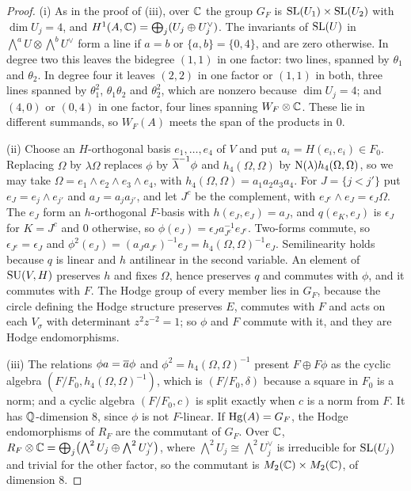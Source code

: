 \begin{proof}
(i) As in the proof of (iii), over $\mathbb{C}$ the group $G_{F}$
is $\operatorname{SL}(U_{1})\times\operatorname{SL}(U_{2})$ with $\dim U_{j}=4$, and
$H^{1}(A,\mathbb{C})=\bigoplus_{j}(U_{j}\oplus U_{j}^{\vee})$. The invariants of
$\operatorname{SL}(U)$ in $\bigwedge^{a}U\otimes\bigwedge^{b}U^{\vee}$ form a line if $a=b$
or $\{a,b\}=\{0,4\}$, and are zero otherwise. In degree two this leaves the
bidegree $(1,1)$ in one factor: two lines, spanned by $\theta_{1}$ and
$\theta_{2}$. In degree four it leaves $(2,2)$ in one factor or $(1,1)$ in
both, three lines spanned by $\theta_{1}^{2}$, $\theta_{1}\theta_{2}$ and
$\theta_{2}^{2}$, which are nonzero because $\dim U_{j}=4$; and $(4,0)$ or
$(0,4)$ in one factor, four lines spanning $W_{F}\otimes\mathbb{C}$. These lie in
different summands, so $W_{F}(A)$ meets the span of the products in $0$.

(ii) Choose an $H$-orthogonal basis $e_{1},\dots,e_{4}$ of $V$ and put
$a_{i}=H(e_{i},e_{i})\in F_{0}$. Replacing $\Omega$ by $\lambda\Omega$
replaces $\phi$ by $\overline{\lambda}^{-1}\phi$ and $h_{4}(\Omega,\Omega)$ by
$\mathrm{N}(\lambda)h_{4}(\Omega,\Omega)$, so we may take
$\Omega=e_{1}\wedge e_{2}\wedge e_{3}\wedge e_{4}$, with
$h_{4}(\Omega,\Omega)=a_{1}a_{2}a_{3}a_{4}$. For $J=\{j<j'\}$ put
$e_{J}=e_{j}\wedge e_{j'}$ and $a_{J}=a_{j}a_{j'}$, and let $J^{c}$ be the
complement, with $e_{J^{c}}\wedge e_{J}=\epsilon_{J}\Omega$. The $e_{J}$ form
an $h$-orthogonal $F$-basis with $h(e_{J},e_{J})=a_{J}$, and
$q(e_{K},e_{J})$ is $\epsilon_{J}$ for $K=J^{c}$ and $0$ otherwise, so
$\phi(e_{J})=\epsilon_{J}a_{J^{c}}^{-1}e_{J^{c}}$. Two-forms commute, so
$\epsilon_{J^{c}}=\epsilon_{J}$ and
$\phi^{2}(e_{J})=(a_{J}a_{J^{c}})^{-1}e_{J}=h_{4}(\Omega,\Omega)^{-1}e_{J}$.
Semilinearity holds because $q$ is linear and $h$ antilinear in the second
variable. An element of $\operatorname{SU}(V,H)$ preserves $h$ and fixes $\Omega$, hence
preserves $q$ and commutes with $\phi$, and it commutes with $F$. The Hodge
group of every member lies in $G_{F}$, because the circle defining the Hodge
structure preserves $E$, commutes with $F$ and acts on each $V_{\sigma}$ with
determinant $z^{2}z^{-2}=1$; so $\phi$ and $F$ commute with it, and they are
Hodge endomorphisms.

(iii) The relations $\phi a=\overline{a}\phi$ and $\phi^{2}=h_{4}(\Omega,\Omega)^{-1}$
present $F\oplus F\phi$ as the cyclic algebra
$(F/F_{0},h_{4}(\Omega,\Omega)^{-1})$, which is $(F/F_{0},\delta)$ because a
square in $F_{0}$ is a norm; and a cyclic algebra $(F/F_{0},c)$ is split
exactly when $c$ is a norm from $F$. It has $\mathbb{Q}$-dimension $8$, since $\phi$
is not $F$-linear. If $\operatorname{Hg}(A)=G_{F}$, the Hodge endomorphisms of $R_{F}$ are
the commutant of $G_{F}$. Over $\mathbb{C}$,
$R_{F}\otimes\mathbb{C}=\bigoplus_{j}\bigl(\bigwedge^{2}U_{j}\oplus
\bigwedge^{2}U_{j}^{\vee}\bigr)$, where
$\bigwedge^{2}U_{j}\cong\bigwedge^{2}U_{j}^{\vee}$ is irreducible for
$\operatorname{SL}(U_{j})$ and trivial for the other factor, so the commutant is
$M_{2}(\mathbb{C})\times M_{2}(\mathbb{C})$, of dimension $8$.


\end{proof}
